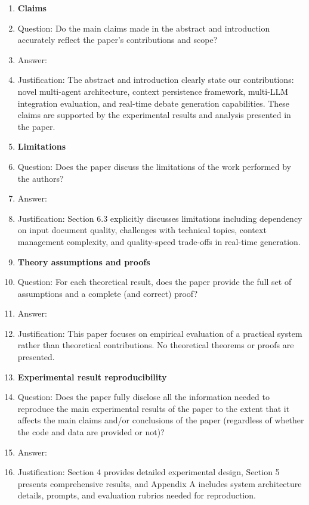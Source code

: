 \documentclass[11pt]{article}
\begin{document}
\begin{enumerate}

\item {\bf Claims}
    \item[] Question: Do the main claims made in the abstract and introduction accurately reflect the paper's contributions and scope?
    \item[] Answer: \answerYes{} 
    \item[] Justification: The abstract and introduction clearly state our contributions: novel multi-agent architecture, context persistence framework, multi-LLM integration evaluation, and real-time debate generation capabilities. These claims are supported by the experimental results and analysis presented in the paper.
    
\item {\bf Limitations}
    \item[] Question: Does the paper discuss the limitations of the work performed by the authors?
    \item[] Answer: \answerYes{} 
    \item[] Justification: Section 6.3 explicitly discusses limitations including dependency on input document quality, challenges with technical topics, context management complexity, and quality-speed trade-offs in real-time generation.
    
\item {\bf Theory assumptions and proofs}
    \item[] Question: For each theoretical result, does the paper provide the full set of assumptions and a complete (and correct) proof?
    \item[] Answer: \answerNA{} 
    \item[] Justification: This paper focuses on empirical evaluation of a practical system rather than theoretical contributions. No theoretical theorems or proofs are presented.
    
\item {\bf Experimental result reproducibility}
    \item[] Question: Does the paper fully disclose all the information needed to reproduce the main experimental results of the paper to the extent that it affects the main claims and/or conclusions of the paper (regardless of whether the code and data are provided or not)?
    \item[] Answer: \answerYes{} 
    \item[] Justification: Section 4 provides detailed experimental design, Section 5 presents comprehensive results, and Appendix A includes system architecture details, prompts, and evaluation rubrics needed for reproduction.
    

\end{enumerate}
\end{document}
